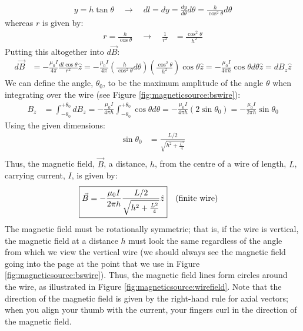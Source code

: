 \begin{align*}
y = h\tan\theta\quad \to \quad
dl = dy = \frac{dy}{d\theta}d\theta = \frac{h}{\cos^2\theta}d\theta
\end{align*}
whereas $r$ is given by:
\begin{align*}
r=\frac{h}{\cos\theta}\quad \to \quad
\frac{1}{r^2}&=\frac{\cos^2\theta}{h^2}
\end{align*}
Putting this altogether into $d\vec B$:
\begin{align*}
d\vec B &=-\frac{\mu_0 I}{4\pi}\frac{dl\cos\theta}{r^2}\hat z = -\frac{\mu_0 I}{4\pi}\left(\frac{h}{\cos^2\theta}d\theta\right) \left( \frac{\cos^2\theta}{h^2} \right)\cos\theta\hat z=-\frac{\mu_0 I}{4\pi h}\cos\theta d\theta \hat z=dB_z\hat z
\end{align*}
We can define the angle, $\theta_0$, to be the maximum amplitude of the angle $\theta$ when integrating over the wire (see Figure \ref{fig:magneticsource:bswire}):
\begin{align*}
B_z&=\int_{-\theta_0}^{+\theta_0}dB_z= -\frac{\mu_0 I}{4\pi h} \int_{-\theta_0}^{+\theta_0}\cos\theta d\theta=-\frac{\mu_0 I}{4\pi h}(2\sin\theta_0) =-\frac{\mu_0 I}{2\pi h}\sin\theta_0
\end{align*}
Using the given dimensions:
\begin{align*}
\sin\theta_0&=\frac{L/2}{\sqrt{h^2+\frac{L^2}{4}}}\\
\end{align*}
Thus, the magnetic field, $\vec B$, a distance, $h$, from the centre of a wire of length, $L$, carrying current, $I$, is given by:
\begin{align*}
\Aboxed{\vec B &= -\frac{\mu_0 I}{2\pi h}\frac{L/2}{\sqrt{h^2+\frac{L^2}{4}}}\hat z}\quad\text{(finite wire)}
\end{align*}
The magnetic field must be rotationally symmetric; that is, if the wire is vertical, the magnetic field at a distance $h$ must look the same regardless of the angle from which we view the vertical wire (we should always see the magnetic field going into the page at the point that we use in Figure \ref{fig:magneticsource:bswire}). Thus, the magnetic field lines form circles around the wire, as illustrated in Figure \ref{fig:magneticsource:wirefield}. Note that the direction of the magnetic field is given by the right-hand rule for axial vectors; when you align your thumb with the current, your fingers curl in the direction of the magnetic field.


